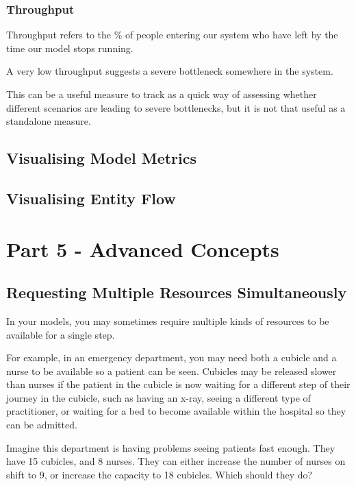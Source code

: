 \documentclass[
  letterpaper,
  DIV=11,
  numbers=noendperiod]{scrreprt}
\begin{document}
\section{Throughput}\label{throughput}

Throughput refers to the \% of people entering our system who have left
by the time our model stops running.

A very low throughput suggests a severe bottleneck somewhere in the
system.

This can be a useful measure to track as a quick way of assessing
whether different scenarios are leading to severe bottlenecks, but it is
not that useful as a standalone measure.

\chapter{Visualising Model Metrics}\label{visualising-model-metrics}

\chapter{Visualising Entity Flow}\label{visualising-entity-flow}

\part{Part 5 - Advanced Concepts}

\chapter{Requesting Multiple Resources
Simultaneously}\label{requesting-multiple-resources-simultaneously}

In your models, you may sometimes require multiple kinds of resources to
be available for a single step.

For example, in an emergency department, you may need both a cubicle and
a nurse to be available so a patient can be seen. Cubicles may be
released slower than nurses if the patient in the cubicle is now waiting
for a different step of their journey in the cubicle, such as having an
x-ray, seeing a different type of practitioner, or waiting for a bed to
become available within the hospital so they can be admitted.

Imagine this department is having problems seeing patients fast enough.
They have 15 cubicles, and 8 nurses. They can either increase the number
of nurses on shift to 9, or increase the capacity to 18 cubicles. Which
should they do?
\end{document}
